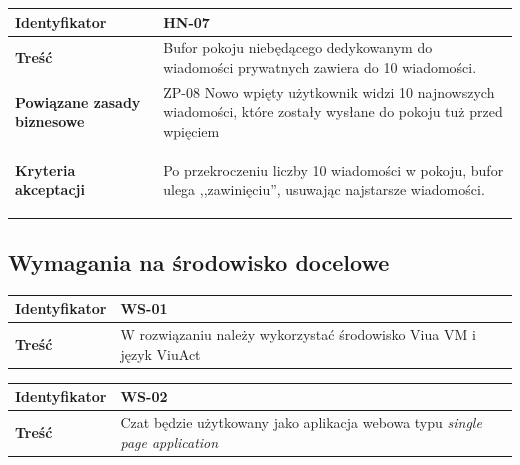 \vspace{1em}

\begin{tabular}{ | l | l | }
	\hline
		\textbf{Identyfikator} &
		HN-07
		\\

	\hline
		\textbf{Treść} & \parbox[t]{11.5cm}{\strut
			Bufor pokoju niebędącego dedykowanym do wiadomości prywatnych zawiera do
      10 wiadomości.
		\strut}\\

	\hline
		\parbox[t]{4cm}{\textbf{Powiązane zasady biznesowe}} & \parbox[t]{11.5cm}{\strut
			ZP-08 Nowo wpięty użytkownik widzi 10 najnowszych wiadomości,
      które zostały wysłane do pokoju tuż przed wpięciem
		\strut}\\

	\hline
		\parbox[t]{4cm}{\textbf{Kryteria akceptacji}} & \parbox[t]{11.5cm}{\strut
			\begin{enumreq}
				\item Po przekroczeniu liczby 10 wiadomości w pokoju, bufor ulega
        ,,zawinięciu'', usuwając najstarsze wiadomości.
			\end{enumreq}
			\strut}
		\\

	\hline
\end{tabular}

\newpage

\subsection{Wymagania na środowisko docelowe}

\leavevmode\hbox{}

\begin{tabular}{ | l | l | }
	\hline
		\textbf{Identyfikator} &
	WS-01
		\\

	\hline
		\textbf{Treść} & \parbox[t]{13cm}{
			W rozwiązaniu należy wykorzystać środowisko Viua VM i
			język ViuAct
		}\\

	\hline
\end{tabular}

\vspace{1em}

\begin{tabular}{ | l | l | }
	\hline
		\textbf{Identyfikator} &
	WS-02
		\\

	\hline
		\textbf{Treść} & \parbox[t]{13cm}{
			Czat będzie użytkowany jako aplikacja webowa typu
			\textit{single page application}
		}\\

	\hline
\end{tabular}

